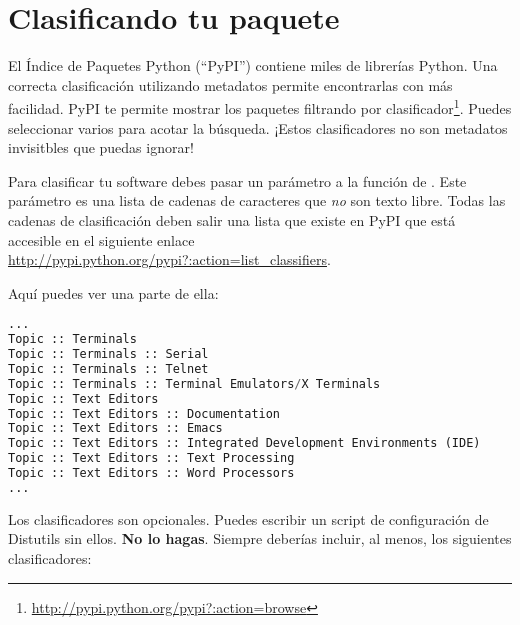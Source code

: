 \section{Clasificando tu paquete}

El Índice de Paquetes Python (``PyPI'') contiene miles de librerías Python. Una correcta clasificación utilizando metadatos permite encontrarlas con más facilidad. PyPI te permite mostrar los paquetes filtrando por clasificador\footnote{\href{http://pypi.python.org/pypi?:action=browse}{http://pypi.python.org/pypi?:action=browse}}. Puedes seleccionar varios para acotar la búsqueda. ¡Estos clasificadores no son metadatos invisitbles que puedas ignorar!

Para clasificar tu software debes pasar un parámetro  a la función  de . Este parámetro es una lista de cadenas de caracteres que \emph{no} son texto libre. Todas las cadenas de clasificación deben salir una lista que existe en PyPI que está accesible en el siguiente enlace \href{http://pypi.python.org/pypi?:action=list\_classifiers}{http://pypi.python.org/pypi?:action=list\_classifiers}.

Aquí puedes ver una parte de ella:


\begin{lstlisting}[language=Python,breaklines=true]
...
Topic :: Terminals
Topic :: Terminals :: Serial
Topic :: Terminals :: Telnet
Topic :: Terminals :: Terminal Emulators/X Terminals
Topic :: Text Editors
Topic :: Text Editors :: Documentation
Topic :: Text Editors :: Emacs
Topic :: Text Editors :: Integrated Development Environments (IDE)
Topic :: Text Editors :: Text Processing
Topic :: Text Editors :: Word Processors
...
\end{lstlisting}

Los clasificadores son opcionales. Puedes escribir un script de configuración de Distutils sin ellos. \textbf{No lo hagas}. Siempre deberías incluir, al menos, los siguientes clasificadores:

